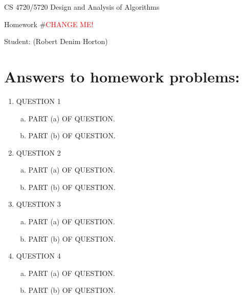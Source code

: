 \documentclass[11pt]{article}
\begin{document}
 

\rhead{\today}

\begin{center}\begin{Large}
CS 4720/5720 Design and Analysis of Algorithms

Homework \#\textcolor{red}{CHANGE ME!}

Student: (Robert Denim Horton)
\end{Large}
\end{center}


\section*{Answers to homework problems:}

\begin{enumerate}
\item QUESTION 1
	\begin{enumerate}[(a)]
		\item PART (a) OF QUESTION.
		\item PART (b) OF QUESTION.
	\end{enumerate}
\item QUESTION 2
	\begin{enumerate}[(a)]
		\item PART (a) OF QUESTION.
		\item PART (b) OF QUESTION.
	\end{enumerate}
\item QUESTION 3
	\begin{enumerate}[(a)]
		\item PART (a) OF QUESTION.
		\item PART (b) OF QUESTION.
	\end{enumerate}
\item QUESTION 4
	\begin{enumerate}[(a)]
		\item PART (a) OF QUESTION.
		\item PART (b) OF QUESTION.
	\end{enumerate}
\end{enumerate}
\end{document}
